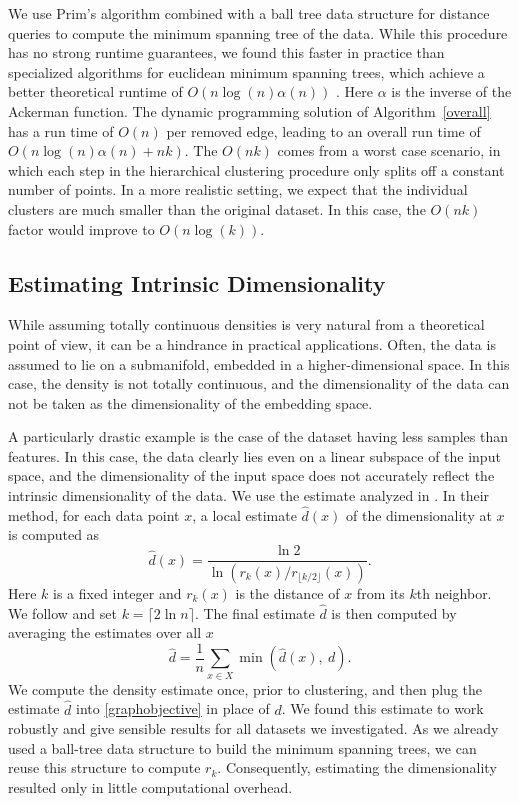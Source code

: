 We use Prim's algorithm combined with a ball tree data structure for distance
queries to compute the minimum spanning tree of the data.
While this procedure has no strong runtime guarantees, we found this faster
in practice than specialized algorithms for euclidean minimum spanning trees, 
which achieve a better theoretical runtime of $O(n \log(n) \alpha(n))$ \citep{dtb2010}. Here
$\alpha$ is the inverse of the Ackerman function. The dynamic programming solution of
Algorithm~\ref{overall} has a run time of $O(n)$ per removed edge, leading to an overall
run time of $O(n \log(n) \alpha(n)+ nk)$. The $O(nk)$ comes from a worst case
scenario, in which each step in the hierarchical clustering procedure only
splits off a constant number of points. In a more realistic setting, we expect
that the individual clusters are much smaller than the original dataset. In
this case, the $O(nk)$ factor would improve to $O(n\log(k))$.

\subsection{Estimating Intrinsic Dimensionality}
While assuming totally continuous densities is very natural from a theoretical
point of view, it can be a hindrance in practical applications.  Often, the
data is assumed to lie on a submanifold, embedded in a
higher-dimensional space. In this case, the density is not totally continuous,
and the dimensionality of the data can not be taken as the dimensionality of
the embedding space.

A particularly drastic example is the case of the dataset having less samples
than features. In this case, the data clearly lies even on a linear subspace
of the input space, and the dimensionality of the input space does not
accurately reflect the intrinsic dimensionality of the data.
We use the estimate analyzed in \citet{massoud2007manifold}.
In their method, for each data point $x$, a local estimate $\hat{d}(x)$ of the
dimensionality at $x$ is computed as
\begin{equation}
    \hat{d}(x) = \frac{\ln 2}{\ln\left(r_k(x) / r_{\lfloor k /2 \rfloor}(x)\right)}.
\end{equation}
Here $k$ is a fixed integer and $r_k(x)$ is the distance of $x$ from its $k$th neighbor.
We follow \citet{massoud2007manifold} and set $k =\lceil 2 \ln n\rceil$.
The final estimate $\hat{d}$ is then computed by averaging the estimates over all $x$
\begin{equation}
    \hat{d} = \frac{1}{n}\sum_{x \in X} \min\left(\hat{d}(x),\ d\right).
\end{equation}
We compute the density estimate once, prior to clustering, and then plug the
estimate $\hat{d}$ into \eqref{graphobjective} in place of $d$.
We found this estimate to work robustly and give sensible results for all
datasets we investigated. As we already used a ball-tree data structure to
build the minimum spanning trees, we can reuse this structure to compute $r_k$.
Consequently, estimating the dimensionality resulted only in little
computational overhead.


